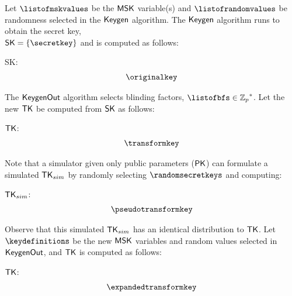 \documentclass[11pt]{article}
\begin{document}
Let $\listofmskvalues$ be the $\mathsf{MSK}$ variable(s) and $\listofrandomvalues$ be randomness selected in the $\mathsf{Keygen}$ algorithm. The $\mathsf{Keygen}$ algorithm runs to obtain the secret key, \\ $\SK = \{\secretkey\}$ and is computed as follows:

\begin{description}
\item {\sf SK}: \begin{multline*}  \originalkey \end{multline*}
\end{description}

\noindent
The $\mathsf{KeygenOut}$ algorithm selects blinding factors, $\listofbfs \in \Zp^*$. Let the new $\mathsf{TK}$ be computed from $\mathsf{SK}$ as follows:

\begin{description}
\item {\sf $\mathsf{TK}$}: \begin{multline*}  \transformkey \end{multline*}
\end{description}

\noindent
Note that a simulator given only public parameters ($\mathsf{PK}$) can formulate a simulated ${\sf TK}_{sim}$ by randomly selecting $\randomsecretkeys$ and computing: 

\begin{description}
\item {\sf ${\sf TK}_{sim}$}: \begin{multline*}  \pseudotransformkey \end{multline*}
\end{description}

Observe that this simulated ${\sf TK}_{sim}$ has an identical distribution to $\mathsf{TK}$.  Let $\keydefinitions$ be the new $\mathsf{MSK}$ variables and random values selected in $\mathsf{KeygenOut}$, and $\mathsf{TK}$ is computed as follows:

\begin{description}
\item {\sf $\mathsf{TK}$}: \begin{multline*}  \expandedtransformkey \end{multline*} 
\end{description}

%
%
%
%
\end{document}
